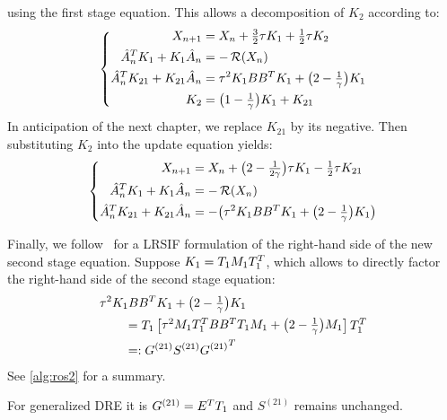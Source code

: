 using the first stage equation.
This allows a decomposition of $K_2$ according to:
\begin{equation}
\left\{
\begin{aligned}
  X_{n+1} &= X_n + \tfrac{3}{2} \tau K_1 + \tfrac{1}{2} \tau K_2 \\
  \hat A_n^T K_1 + K_1 \hat A_n &= -\operatorname{\mathcal R}(X_n) \\
  \hat A_n^T K_{21} + K_{21} \hat A_n &= \tau^2 K_1 BB^T K_1 + \big( 2-\tfrac{1}{\gamma} \big) K_1 \\
  K_2 &= \big( 1-\tfrac{1}{\gamma} \big) K_1 + K_{21}
\end{aligned}
\right.
\end{equation}
In anticipation of the next chapter, we replace $K_{21}$ by its negative.
Then substituting $K_2$ into the update equation yields:
\begin{equation}
\left\{
\begin{aligned}
  X_{n+1} &= X_n + \big( 2 - \tfrac{1}{2\gamma} \big) \tau K_1 - \tfrac{1}{2} \tau K_{21} \\
  \hat A_n^T K_1 + K_1 \hat A_n &= -\operatorname{\mathcal R}(X_n) \\
  \hat A_n^T K_{21} + K_{21} \hat A_n &= -\big( \tau^2 K_1 BB^T K_1 + \big( 2-\tfrac{1}{\gamma} \big) K_1 \big)
\end{aligned}
\right.
\end{equation}

Finally, we follow~\cite{Lang2015} for a \ac{LRSIF} formulation of the right-hand side of the new second stage equation.
Suppose $K_1 = T_1 M_1 T_1^T$,
which allows to directly factor the right-hand side of the second stage equation:
\begin{subequations}
\begin{align}
  \MoveEqLeft
  \tau^2 K_1 BB^\T K_1 + \big( 2-\tfrac{1}{\gamma} \big) K_1
  \nonumber \\
  &= T_1 \begin{bmatrix}
    \tau^2 M_1 T_1^\T BB^\T T_1 M_1 + \big( 2-\tfrac{1}{\gamma} \big) M_1
  \end{bmatrix}
  T_1^\T
  \\
  &=: G^{(21)} S^{(21)} {G^{(21)}}^\T
\end{align}
\end{subequations}
See \autoref{alg:ros2} for a summary.

\begin{remark}
  For generalized \ac{DRE} it is $G^{(21)} = E^T T_1$ and $S^{(21)}$ remains unchanged.
\end{remark}

